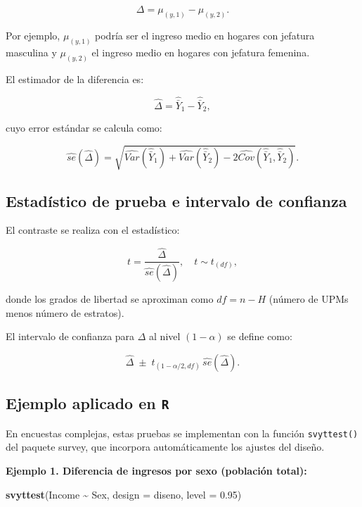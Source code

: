 \documentclass[
  12pt,
]{book}
\newenvironment{Shaded}{\begin{snugshade}}{\end{snugshade}}
\newcommand{\AttributeTok}[1]{\textcolor[rgb]{0.13,0.29,0.53}{#1}}
\newcommand{\FloatTok}[1]{\textcolor[rgb]{0.00,0.00,0.81}{#1}}
\newcommand{\FunctionTok}[1]{\textcolor[rgb]{0.13,0.29,0.53}{\textbf{#1}}}
\newcommand{\NormalTok}[1]{#1}
\newcommand{\SpecialCharTok}[1]{\textcolor[rgb]{0.81,0.36,0.00}{\textbf{#1}}}
\begin{document}
\[
\Delta = \mu_{(y,1)} - \mu_{(y,2)}.
\]

Por ejemplo, \(\mu_{(y,1)}\) podría ser el ingreso medio en hogares con jefatura masculina y \(\mu_{(y,2)}\) el ingreso medio en hogares con jefatura femenina.

El estimador de la diferencia es:

\[
\hat{\Delta} = \hat{\bar{Y}}_1 - \hat{\bar{Y}}_2,
\]

cuyo error estándar se calcula como:

\[
\hat{se}(\hat{\Delta}) = \sqrt{ \hat{Var}(\hat{\bar{Y}}_1) + \hat{Var}(\hat{\bar{Y}}_2) - 2 \hat{Cov}(\hat{\bar{Y}}_1, \hat{\bar{Y}}_2)}.
\]

\subsection{Estadístico de prueba e intervalo de confianza}\label{estaduxedstico-de-prueba-e-intervalo-de-confianza}

El contraste se realiza con el estadístico:

\[
t = \frac{\hat{\Delta}}{\hat{se}(\hat{\Delta})}, \quad t \sim t_{(df)},
\]

donde los grados de libertad se aproximan como \(df = n - H\) (número de UPMs menos número de estratos).

El intervalo de confianza para \(\Delta\) al nivel \((1-\alpha)\) se define como:

\[
\hat{\Delta} \;\pm\; t_{(1-\alpha/2,df)} \, \hat{se}(\hat{\Delta}).
\]

\subsection{\texorpdfstring{Ejemplo aplicado en \texttt{R}}{Ejemplo aplicado en R}}\label{ejemplo-aplicado-en-r}

En encuestas complejas, estas pruebas se implementan con la función \texttt{svyttest()} del paquete survey, que incorpora automáticamente los ajustes del diseño.

\textbf{Ejemplo 1. Diferencia de ingresos por sexo (población total):}

\begin{Shaded}
\begin{Highlighting}[]
\FunctionTok{svyttest}\NormalTok{(Income }\SpecialCharTok{\textasciitilde{}}\NormalTok{ Sex, }\AttributeTok{design =}\NormalTok{ diseno, }\AttributeTok{level =} \FloatTok{0.95}\NormalTok{)}
\end{Highlighting}
\end{Shaded}
\end{document}
